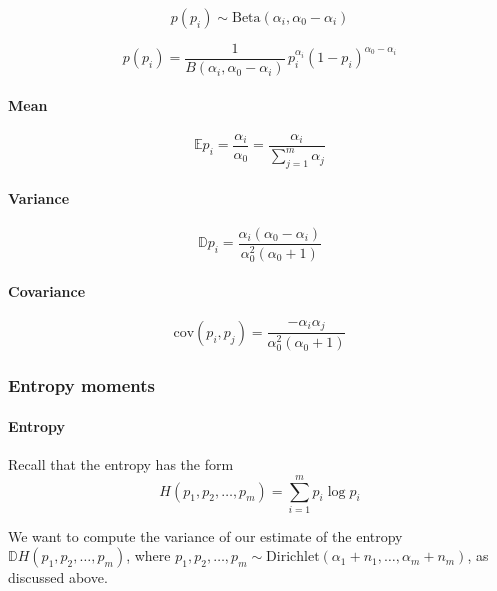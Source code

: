 \documentclass{article}
\newcommand{\expect}[1]{
	\mathbb{E} #1
}
\begin{document}
\begin{equation*}
p(p_i) \sim \textrm{Beta}(\alpha_i, \alpha_0 - \alpha_i)
\end{equation*}

\begin{equation}
p(p_i) = \frac{1}{B(\alpha_i, \alpha_0 - \alpha_i)} \, p_i^{\alpha_i} (1 - p_i)^{\alpha_0 - \alpha_i}
\end{equation}

\paragraph{Mean}
\begin{equation}
\expect{p_i} = \frac{\alpha_i}{\alpha_0} = \frac{\alpha_i}{\sum\limits_{j=1}^m{\alpha_j}}
\end{equation}

\paragraph{Variance}
\begin{equation}
\mathbb{D}{p_i} = \frac{\alpha_i(\alpha_0 - \alpha_i)}{\alpha_0^2(\alpha_0 + 1)}
\end{equation}

\paragraph{Covariance}
\begin{equation}
\textrm{cov}(p_i, p_j) = \frac{-\alpha_i\alpha_j}{\alpha_0^2(\alpha_0 + 1)}
\end{equation}

\subsubsection{Entropy moments}
\paragraph{Entropy} Recall that the entropy has the form
\begin{equation*}
H(p_1, p_2, \ldots, p_m) = \sum_{i = 1}^m{p_i \log p_i}
\end{equation*}

We want to compute the variance of our estimate of the entropy $\mathbb{D}H(p_1, p_2, \ldots, p_m)$, where $p_1, p_2, \ldots, p_m \sim \textrm{Dirichlet}(\alpha_1 + n_1, \ldots, \alpha_m + n_m)$, as discussed above.
\end{document}
